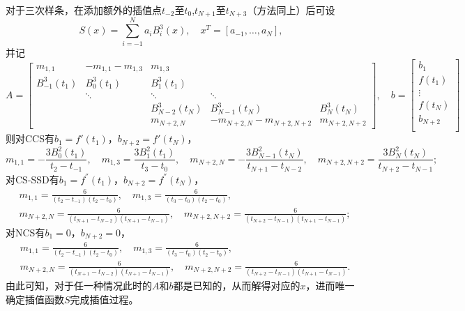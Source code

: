 \documentclass{ctexart}
\begin{document}
\begin{sloppypar}
对于三次样条，在添加额外的插值点$t_{-2}$至$t_0$,$t_{N+1}$至$t_{N+3}$（方法同上）后可设
\begin{equation}
    S(x) = \sum^N_{i=-1}a_iB^3_i(x),\quad x^T = [a_{-1},\dots,a_N],
\end{equation}
并记
$$
A = 
\begin{bmatrix}
    m_{1,1} & -m_{1,1}-m_{1,3}& m_{1,3} & & \\
    B^3_{-1}(t_1) & B^3_{0}(t_1) & B^3_{1}(t_1) & &\\
    & \ddots & \ddots & \ddots &\\
    & & B^3_{N-2}(t_N) & B^3_{N-1}(t_N) & B^3_{N}(t_N) \\
    & & m_{N+2,N} & -m_{N+2,N}-m_{N+2,N+2} & m_{N+2,N+2}
\end{bmatrix}
, \quad b = 
\begin{bmatrix}
    b_1 \\
    f(t_1) \\
    \vdots \\
    f(t_N) \\
    b_{N+2} \\
\end{bmatrix}
$$
则对CCS有$b_1 = f'(t_1)$，$b_{N+2} = f'(t_N)$，
\begin{equation}
    m_{1,1} = -\frac{3B^2_{0}(t_1)}{t_2 - t_{-1}},\quad m_{1,3} = \frac{3B^2_{1}(t_1)}{t_3 - t_{0}},\quad m_{N+2,N} = -\frac{3B^2_{N-1}(t_N)}{t_{N+1} - t_{N-2}},\quad m_{N+2,N+2} = \frac{3B^2_{N}(t_N)}{t_{N+2} - t_{N-1}};
\end{equation}
对CS-SSD有$b_1 = f^{''}(t_1)$，$b_{N+2} = f^{''}(t_N)$，
\begin{equation}
\begin{split}
    &m_{1,1} = \frac{6}{(t_2 - t_{-1})(t_2 - t_{0})},\quad m_{1,3} = \frac{6}{(t_3 - t_{0})(t_2 - t_{0})},\\
    &m_{N+2,N} = \frac{6}{(t_{N+1} - t_{N-2})(t_{N+1} - t_{N-1})},\quad m_{N+2,N+2} = \frac{6}{(t_{N+2} - t_{N-1})(t_{N+1} - t_{N-1})};
\end{split}
\end{equation}
对NCS有$b_1 = 0$，$b_{N+2} = 0$，
\begin{equation}
\begin{split}
    &m_{1,1} = \frac{6}{(t_2 - t_{-1})(t_2 - t_{0})},\quad m_{1,3} = \frac{6}{(t_3 - t_{0})(t_2 - t_{0})},\\
    &m_{N+2,N} = \frac{6}{(t_{N+1} - t_{N-2})(t_{N+1} - t_{N-1})},\quad m_{N+2,N+2} = \frac{6}{(t_{N+2} - t_{N-1})(t_{N+1} - t_{N-1})}.
\end{split}
\end{equation}
由此可知，对于任一种情况此时的$A$和$b$都是已知的，从而解得对应的$x$，进而唯一确定插值函数$S$完成插值过程。


\end{sloppypar}
\end{document}

